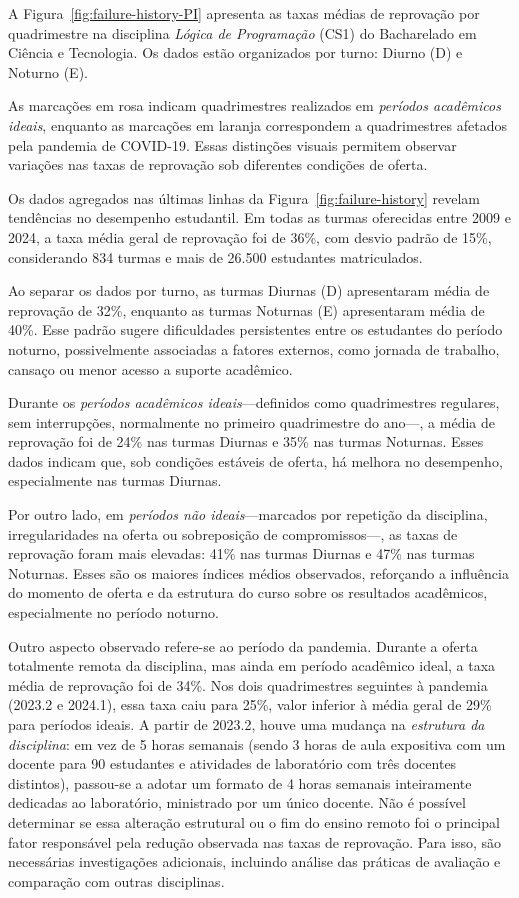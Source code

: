 A Figura~\ref{fig:failure-history-PI} apresenta as taxas médias de reprovação por quadrimestre na disciplina \textit{Lógica de Programação} (CS1) do Bacharelado em Ciência e Tecnologia. Os dados estão organizados por turno: Diurno (D) e Noturno (E).

As marcações em rosa indicam quadrimestres realizados em \textit{períodos acadêmicos ideais}, enquanto as marcações em laranja correspondem a quadrimestres afetados pela pandemia de COVID-19. Essas distinções visuais permitem observar variações nas taxas de reprovação sob diferentes condições de oferta.

Os dados agregados nas últimas linhas da Figura~\ref{fig:failure-history} revelam tendências no desempenho estudantil. Em todas as turmas oferecidas entre 2009 e 2024, a taxa média geral de reprovação foi de 36\%, com desvio padrão de 15\%, considerando 834 turmas e mais de 26.500 estudantes matriculados.

Ao separar os dados por turno, as turmas Diurnas (D) apresentaram média de reprovação de 32\%, enquanto as turmas Noturnas (E) apresentaram média de 40\%. Esse padrão sugere dificuldades persistentes entre os estudantes do período noturno, possivelmente associadas a fatores externos, como jornada de trabalho, cansaço ou menor acesso a suporte acadêmico.

Durante os \textit{períodos acadêmicos ideais}—definidos como quadrimestres regulares, sem interrupções, normalmente no primeiro quadrimestre do ano—, a média de reprovação foi de 24\% nas turmas Diurnas e 35\% nas turmas Noturnas. Esses dados indicam que, sob condições estáveis de oferta, há melhora no desempenho, especialmente nas turmas Diurnas.

Por outro lado, em \textit{períodos não ideais}—marcados por repetição da disciplina, irregularidades na oferta ou sobreposição de compromissos—, as taxas de reprovação foram mais elevadas: 41\% nas turmas Diurnas e 47\% nas turmas Noturnas. Esses são os maiores índices médios observados, reforçando a influência do momento de oferta e da estrutura do curso sobre os resultados acadêmicos, especialmente no período noturno.

Outro aspecto observado refere-se ao período da pandemia. Durante a oferta totalmente remota da disciplina, mas ainda em período acadêmico ideal, a taxa média de reprovação foi de 34\%. Nos dois quadrimestres seguintes à pandemia (2023.2 e 2024.1), essa taxa caiu para 25\%, valor inferior à média geral de 29\% para períodos ideais. A partir de 2023.2, houve uma mudança na \textit{estrutura da disciplina}: em vez de 5 horas semanais (sendo 3 horas de aula expositiva com um docente para 90 estudantes e atividades de laboratório com três docentes distintos), passou-se a adotar um formato de 4 horas semanais inteiramente dedicadas ao laboratório, ministrado por um único docente. Não é possível determinar se essa alteração estrutural ou o fim do ensino remoto foi o principal fator responsável pela redução observada nas taxas de reprovação. Para isso, são necessárias investigações adicionais, incluindo análise das práticas de avaliação e comparação com outras disciplinas.

